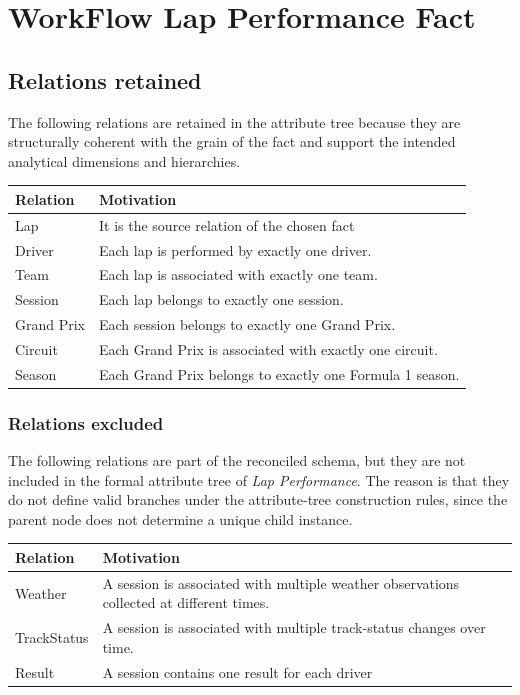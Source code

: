 \documentclass[a4paper,11pt]{article}
\begin{document}
	
	
	\section{WorkFlow Lap Performance Fact}
	
	
	\subsection{Relations retained}
	
	The following relations are retained in the attribute tree because they are structurally coherent with the grain of the fact and support the intended analytical dimensions and hierarchies.
	
	\begin{table}[H]
		\centering
		\begin{tabular}{|p{3.5cm}|p{10cm}|}
			\hline
			\textbf{Relation} & \textbf{Motivation} \\
			\hline
			Lap & It is the source relation of the chosen fact \\
			\hline
			Driver & Each lap is performed by exactly one driver.  \\
			\hline
			Team & Each lap is associated with exactly one team. \\
			\hline
			Session & Each lap belongs to exactly one session. \\
			\hline
			Grand Prix & Each session belongs to exactly one Grand Prix. \\
			\hline
			Circuit & Each Grand Prix is associated with exactly one circuit. \\
			\hline
			Season & Each Grand Prix belongs to exactly one Formula 1 season.  \\
			\hline
		\end{tabular}
	\end{table}
	
	\subsubsection{Relations excluded}
	
	The following relations are part of the reconciled schema, but they are not included in the formal attribute tree of \textit{Lap Performance}.
	The reason is that they do not define valid branches under the attribute-tree construction rules, since the parent node does not determine a unique child instance.
	
	\begin{table}[H]
		\centering
		\begin{tabular}{|p{3.5cm}|p{10cm}|}
			\hline
			\textbf{Relation} & \textbf{Motivation} \\
			\hline
			Weather & A session is associated with multiple weather observations collected at different times.  \\
			\hline
			TrackStatus & A session is associated with multiple track-status changes over time.  \\
			\hline
			Result & A session contains one result for each driver \\
			\hline
		\end{tabular}
	\end{table}
\end{document}
